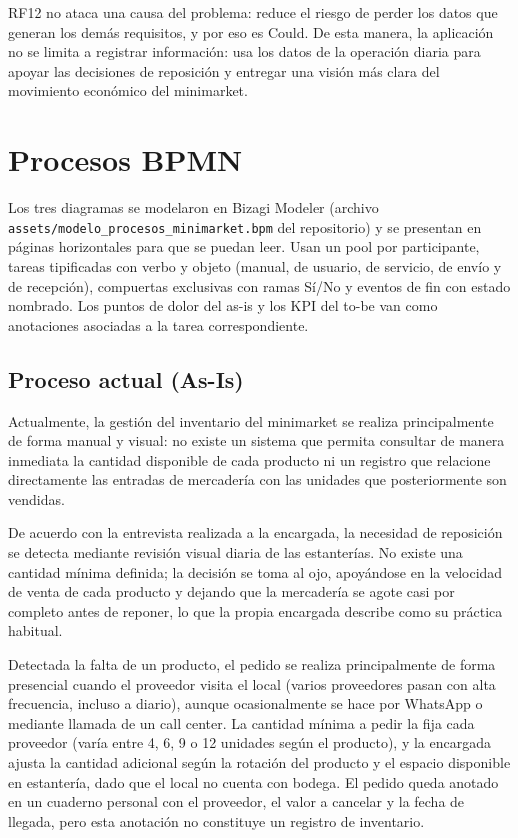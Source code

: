 \documentclass[10pt,a4paper]{article}
\begin{document}
RF12 no ataca una causa del problema: reduce el riesgo de perder los datos que generan los demás requisitos, y por eso es Could. De esta manera, la aplicación no se limita a registrar información: usa los datos de la operación diaria para apoyar las decisiones de reposición y entregar una visión más clara del movimiento económico del minimarket.

\section{Procesos BPMN}

Los tres diagramas se modelaron en Bizagi Modeler (archivo \texttt{assets/modelo\_procesos\_minimarket.bpm} del repositorio) y se presentan en páginas horizontales para que se puedan leer. Usan un pool por participante, tareas tipificadas con verbo y objeto (manual, de usuario, de servicio, de envío y de recepción), compuertas exclusivas con ramas Sí/No y eventos de fin con estado nombrado. Los puntos de dolor del as-is y los KPI del to-be van como anotaciones asociadas a la tarea correspondiente.

\subsection{Proceso actual (As-Is)}

Actualmente, la gestión del inventario del minimarket se realiza principalmente de forma manual y visual: no existe un sistema que permita consultar de manera inmediata la cantidad disponible de cada producto ni un registro que relacione directamente las entradas de mercadería con las unidades que posteriormente son vendidas.

De acuerdo con la entrevista realizada a la encargada, la necesidad de reposición se detecta mediante revisión visual diaria de las estanterías. No existe una cantidad mínima definida; la decisión se toma al ojo, apoyándose en la velocidad de venta de cada producto y dejando que la mercadería se agote casi por completo antes de reponer, lo que la propia encargada describe como su práctica habitual.

Detectada la falta de un producto, el pedido se realiza principalmente de forma presencial cuando el proveedor visita el local (varios proveedores pasan con alta frecuencia, incluso a diario), aunque ocasionalmente se hace por WhatsApp o mediante llamada de un call center. La cantidad mínima a pedir la fija cada proveedor (varía entre 4, 6, 9 o 12 unidades según el producto), y la encargada ajusta la cantidad adicional según la rotación del producto y el espacio disponible en estantería, dado que el local no cuenta con bodega. El pedido queda anotado en un cuaderno personal con el proveedor, el valor a cancelar y la fecha de llegada, pero esta anotación no constituye un registro de inventario.
\end{document}
